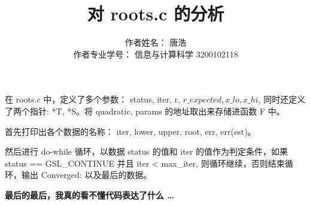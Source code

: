 \documentclass[a4paper,12pt]{ctexart}
\title{对 roots.c 的分析}
\author{作者姓名： 唐浩 \\ 作者专业学号： 信息与计算科学 3200102118}
\begin{document}
\maketitle

在 roots.c 中，定义了多个参数： status, iter, r, $r\_expected, x\_lo, x\_hi$, 同时还定义了两个指针: *T, *S。将 quadratic, params 的地址取出来存储进函数 F 中。

首先打印出各个数据的名称： iter, lower, upper, root, err, err(est)。

然后进行 do-while 循环，以数据 status 的值和 iter 的值作为判定条件，如果 status == GSL\_CONTINUE 并且 iter < max\_iter, 则循环继续，否则结束循环，输出 Converged: 以及最后的数据。

{\bf 最后的最后，我真的看不懂代码表达了什么 \ldots}
\end{document}
